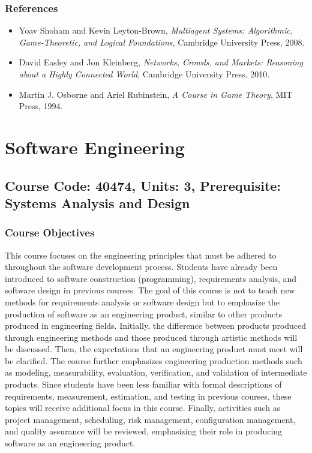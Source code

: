 \documentclass[12pt]{article}
\begin{document}
\subsubsection*{References}
\begin{itemize}
    \item Yoav Shoham and Kevin Leyton-Brown, \textit{Multiagent Systems: Algorithmic, Game-Theoretic, and Logical Foundations}, Cambridge University Press, 2008.
    \item David Easley and Jon Kleinberg, \textit{Networks, Crowds, and Markets: Reasoning about a Highly Connected World}, Cambridge University Press, 2010.
    \item Martin J. Osborne and Ariel Rubinstein, \textit{A Course in Game Theory}, MIT Press, 1994.
\end{itemize}

\newpage

\section{Software Engineering}
\subsection*{Course Code: 40474, Units: 3, Prerequisite: Systems Analysis and Design}

\subsubsection*{Course Objectives}
This course focuses on the engineering principles that must be adhered to throughout the software development process. Students have already been introduced to software construction (programming), requirements analysis, and software design in previous courses. The goal of this course is not to teach new methods for requirements analysis or software design but to emphasize the production of software as an engineering product, similar to other products produced in engineering fields. Initially, the difference between products produced through engineering methods and those produced through artistic methods will be discussed. Then, the expectations that an engineering product must meet will be clarified. The course further emphasizes engineering production methods such as modeling, measurability, evaluation, verification, and validation of intermediate products. Since students have been less familiar with formal descriptions of requirements, measurement, estimation, and testing in previous courses, these topics will receive additional focus in this course. Finally, activities such as project management, scheduling, risk management, configuration management, and quality assurance will be reviewed, emphasizing their role in producing software as an engineering product.
\end{document}
